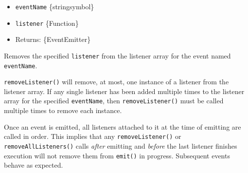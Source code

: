 \begin{itemize}
\tightlist
\item
  \texttt{eventName} \{string\textbar symbol\}
\item
  \texttt{listener} \{Function\}
\item
  Returns: \{EventEmitter\}
\end{itemize}

Removes the specified \texttt{listener} from the listener array for the
event named \texttt{eventName}.

\begin{Shaded}
\begin{Highlighting}[]
\OperatorTok{=}\KeywordTok{=\textgreater{}}\NormalTok{ \{}
  \NormalTok{(}\NormalTok{)}\OperatorTok{;}
\NormalTok{\}}\OperatorTok{;}
\NormalTok{(}\OperatorTok{,}\OperatorTok{;}
\NormalTok{(}\OperatorTok{,}\OperatorTok{;}
\end{Highlighting}
\end{Shaded}

\texttt{removeListener()} will remove, at most, one instance of a
listener from the listener array. If any single listener has been added
multiple times to the listener array for the specified
\texttt{eventName}, then \texttt{removeListener()} must be called
multiple times to remove each instance.

Once an event is emitted, all listeners attached to it at the time of
emitting are called in order. This implies that any
\texttt{removeListener()} or \texttt{removeAllListeners()} calls
\emph{after} emitting and \emph{before} the last listener finishes
execution will not remove them from \texttt{emit()} in progress.
Subsequent events behave as expected.

